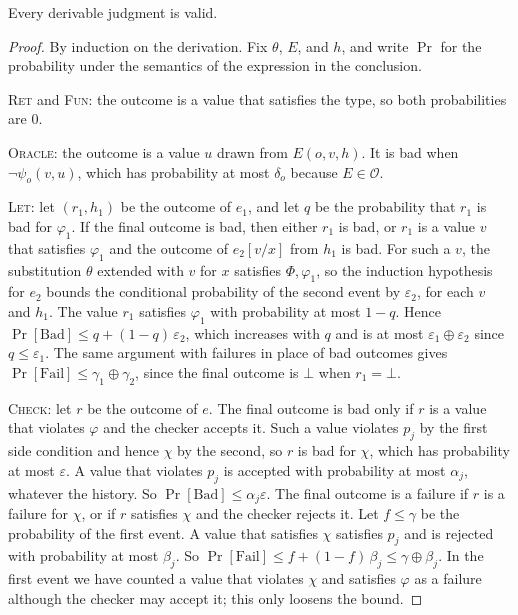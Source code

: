 \documentclass[acmsmall,nonacm,screen]{acmart}
\newcommand{\Bad}{\mathrm{Bad}}
\newcommand{\Fail}{\mathrm{Fail}}
\newcommand{\cO}{\mathcal{O}}
\begin{document}
\begin{theorem}[Soundness]
\label{thm:sound}
Every derivable judgment is valid.
\end{theorem}

\begin{proof}
By induction on the derivation. Fix $\theta$, $E$, and $h$, and write $\Pr$ for the
probability under the semantics of the expression in the conclusion.

\textsc{Ret} and \textsc{Fun}: the outcome is a value that satisfies the type, so both
probabilities are $0$.

\textsc{Oracle}: the outcome is a value $u$ drawn from $E(o, v, h)$. It is bad when
$\neg\psi_o(v, u)$, which has probability at most $\delta_o$ because $E \in \cO$.

\textsc{Let}: let $(r_1, h_1)$ be the outcome of $e_1$, and let $q$ be the probability that
$r_1$ is bad for $\varphi_1$. If the final outcome is bad, then either $r_1$ is bad, or $r_1$
is a value $v$ that satisfies $\varphi_1$ and the outcome of $e_2[v/x]$ from $h_1$ is bad.
For such a $v$, the substitution $\theta$ extended with $v$ for $x$ satisfies
$\Phi, \varphi_1$, so the induction hypothesis for $e_2$ bounds the conditional probability
of the second event by $\varepsilon_2$, for each $v$ and $h_1$. The value $r_1$ satisfies
$\varphi_1$ with probability at most $1 - q$. Hence
$\Pr[\Bad] \le q + (1 - q)\,\varepsilon_2$, which increases with $q$ and is at most
$\varepsilon_1 \oplus \varepsilon_2$ since $q \le \varepsilon_1$. The same argument with
failures in place of bad outcomes gives $\Pr[\Fail] \le \gamma_1 \oplus \gamma_2$, since the
final outcome is $\bot$ when $r_1 = \bot$.

\textsc{Check}: let $r$ be the outcome of $e$. The final outcome is bad only if $r$ is a
value that violates $\varphi$ and the checker accepts it. Such a value violates $p_j$ by the
first side condition and hence $\chi$ by the second, so $r$ is bad for $\chi$, which has
probability at most $\varepsilon$. A value that violates $p_j$ is accepted with probability
at most $\alpha_j$, whatever the history. So $\Pr[\Bad] \le \alpha_j \varepsilon$. The final
outcome is a failure if $r$ is a failure for $\chi$, or if $r$ satisfies $\chi$ and the
checker rejects it. Let $f \le \gamma$ be the probability of the first event. A value that
satisfies $\chi$ satisfies $p_j$ and is rejected with probability at most $\beta_j$. So
$\Pr[\Fail] \le f + (1 - f)\,\beta_j \le \gamma \oplus \beta_j$. In the first event we have
counted a value that violates $\chi$ and satisfies $\varphi$ as a failure although the checker
may accept it; this only loosens the bound.


\end{proof}
\end{document}
